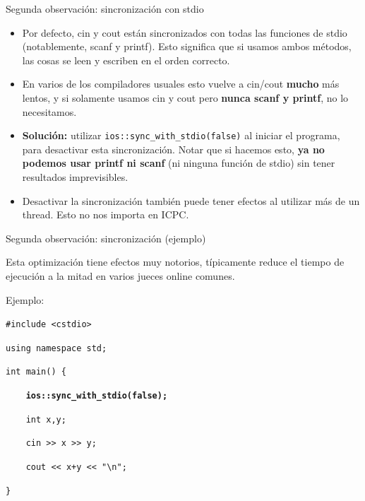 \documentclass{beamer}
\begin{document}
  \begin{frame}{Segunda observación: sincronización con stdio}
  
    \begin{itemize}
        \item Por defecto, cin y cout están sincronizados con todas las funciones de stdio (notablemente, scanf y printf). Esto significa que si usamos ambos métodos, las cosas se leen y escriben en el orden correcto.
        \item En varios de los compiladores usuales esto vuelve a cin/cout \textbf{mucho} más lentos, y si solamente usamos cin y cout pero \textbf{nunca scanf y printf}, no lo necesitamos.
        \item \textbf{Solución:} utilizar \texttt{ios::sync\_with\_stdio(false)} al iniciar el programa, para desactivar esta sincronización. Notar que si hacemos esto, \textbf{ya no podemos usar printf ni scanf} (ni ninguna función de stdio) sin tener resultados imprevisibles.
        \item Desactivar la sincronización también puede tener efectos al utilizar más de un thread. Esto no nos importa en ICPC.
    \end{itemize}
    
  \end{frame}
  
  \begin{frame}{Segunda observación: sincronización (ejemplo)}
  
  Esta optimización tiene efectos muy notorios, típicamente reduce el tiempo de ejecución a la mitad en varios jueces online comunes.
  
  Ejemplo:
        
  \texttt{\#include <cstdio>}
  
  \texttt{using namespace std;}
  
  \texttt{int main() \{}
  
  \textbf{\texttt{    \ \ \ ios::sync\_with\_stdio(false);}}
  
  \texttt{    \ \ \ int x,y;}
      
  \texttt{    \ \ \ cin >{}> x >{}> y;}
      
  \texttt{    \ \ \ cout <{}< x+y <{}< "\textbackslash n";}
      
  \texttt{\}}
  
  \end{frame}
  
\end{document}
